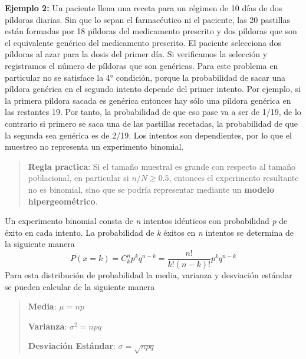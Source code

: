 \documentclass[]{article}
\begin{document}
 \textbf{Ejemplo 2:} Un paciente llena una receta para un régimen de 10 días de dos píldoras diarias. Sin que lo sepan el farmacéutico ni el paciente, las 20 pastillas están formadas por 18 píldoras del medicamento prescrito y dos píldoras que son el equivalente genérico del medicamento prescrito. El paciente selecciona dos píldoras al azar para la dosis del primer día. Si verificamos la selección y registramos el número de píldoras que son genéricas. \newline
 Para este problema en particular no se satisface la 4° condición, porque la probabilidad de sacar una píldora genérica en el segundo intento depende del primer intento. Por ejemplo, si la primera píldora sacada es genérica entonces hay sólo una píldora genérica en las restantes 19. Por tanto, la probabilidad de que eso pase va a ser de 1/19, de lo contrario si primero se saca una de las pastillas recetadas, la probabilidad de que la segunda sea genérica es de 2/19. Los intentos son dependientes, por lo que el muestreo no representa un experimento binomial.
 \begin{quote}
 	\textbf{Regla practica}: Si el tamaño muestral es grande con respecto al tamaño poblacional, en particular si $n/N \geq 0.5$, entonces el experimento resultante no es binomial, sino que se podría representar mediante un \textbf{modelo hipergeométrico}.
 \end{quote}
 
 Un experimento binomial consta de \textit{n} intentos idénticos con probabilidad \textit{p} de éxito en cada intento. La probabilidad de \textit{k} éxitos en \textit{n} intentos se determina de la siguiente manera
 \[ P(x = k) = C^n_kp^kq^{n-k} = \frac{n!}{k!(n-k)!}p^kq^{n-k} \]
 Para esta distribución de probabilidad la media, varianza y desviación estándar se pueden calcular de la siguiente manera
 \begin{quote}
 	\item \textbf{Media}: $\mu = np$
 	\item \textbf{Varianza}: $\sigma^2 = npq$
 	\item \textbf{Desviación Estándar}: $\sigma = \sqrt{npq}$
 \end{quote}
\end{document}

